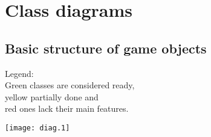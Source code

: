 \documentclass[11pt,a4paper,oneside]{report}
\begin{document}
\chapter{Class diagrams}
\section{Basic structure of game objects}
Legend:
\\\colorbox{gr}{Green} classes are considered ready, 
\\\colorbox{ye}{yellow} partially done and 
\\\colorbox{re}{red} ones lack their main features.

\texttt{[image: diag.1]}
\end{document}
